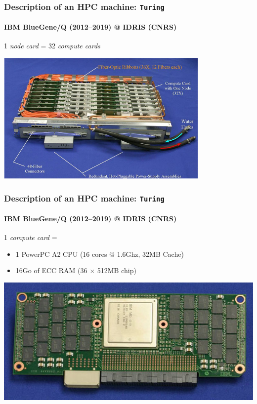 \documentclass[xcolor={x11names,svgnames,psnames}]{beamer}
\begin{document}
\begin{frame}
    \frametitle{Description of an HPC machine: \texttt{Turing}}
  \framesubtitle{IBM BlueGene/Q (2012--2019) @ IDRIS (CNRS)}
  
  1 \textit{node card} = 32 \textit{compute cards}
  
  \begin{center}
    \includegraphics[height=6.5cm]{bgqNodeCard}
  \end{center}
\end{frame}


\begin{frame}
    \frametitle{Description of an HPC machine: \texttt{Turing}}
  \framesubtitle{IBM BlueGene/Q (2012--2019) @ IDRIS (CNRS)}
  
  1 \textit{compute card} =
  \begin{itemize}
  \item 1 PowerPC A2 CPU (16 cores @ 1.6Ghz, 32MB Cache)
  \item 16Go of ECC RAM (36 $\times$ 512MB chip)
  \end{itemize}

  \begin{center}
    \includegraphics[width=\textwidth]{bgqComputeCard}
  \end{center}
\end{frame}
\end{document}
